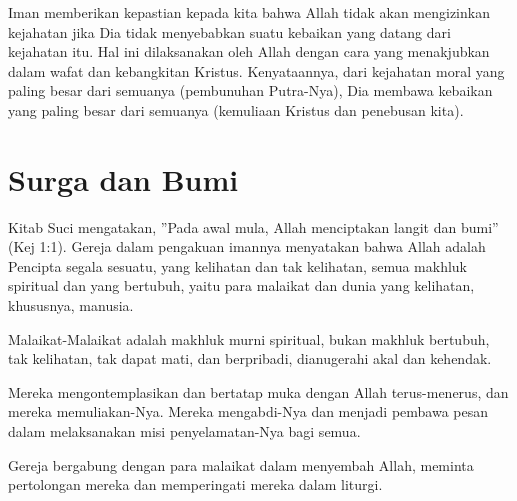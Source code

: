 \newpage
{}
\setcounter{kgkcounter}{57}
\small
{}
      Iman memberikan kepastian kepada kita bahwa Allah tidak akan mengizinkan       
kejahatan jika Dia tidak menyebabkan suatu kebaikan yang datang dari kejahatan       
itu. Hal ini dilaksanakan oleh Allah dengan cara yang menakjubkan dalam wafat
dan kebangkitan Kristus. Kenyataannya, dari kejahatan moral yang paling besar dari
semuanya (pembunuhan Putra-Nya), Dia membawa kebaikan yang paling besar
dari semuanya (kemuliaan Kristus dan penebusan kita).

                                    \section*{Surga dan Bumi}

     Kitab Suci mengatakan, ”Pada awal mula, Allah menciptakan langit dan bumi”      
(Kej 1:1). Gereja dalam pengakuan imannya menyatakan bahwa Allah adalah
Pencipta segala sesuatu, yang kelihatan dan tak kelihatan, semua makhluk spiritual
dan yang bertubuh, yaitu para malaikat dan dunia yang kelihatan, khususnya,
manusia.

Malaikat-Malaikat adalah makhluk murni spiritual, bukan makhluk bertubuh,
tak kelihatan, tak dapat mati, dan berpribadi, dianugerahi akal dan kehendak.

          Mereka mengontemplasikan dan bertatap muka dengan Allah terus-menerus, dan
          mereka memuliakan-Nya. Mereka mengabdi-Nya dan menjadi pembawa pesan
          dalam melaksanakan misi penyelamatan-Nya bagi semua.

Gereja bergabung dengan para malaikat dalam menyembah Allah, meminta
pertolongan mereka dan memperingati mereka dalam liturgi.


\normalsize